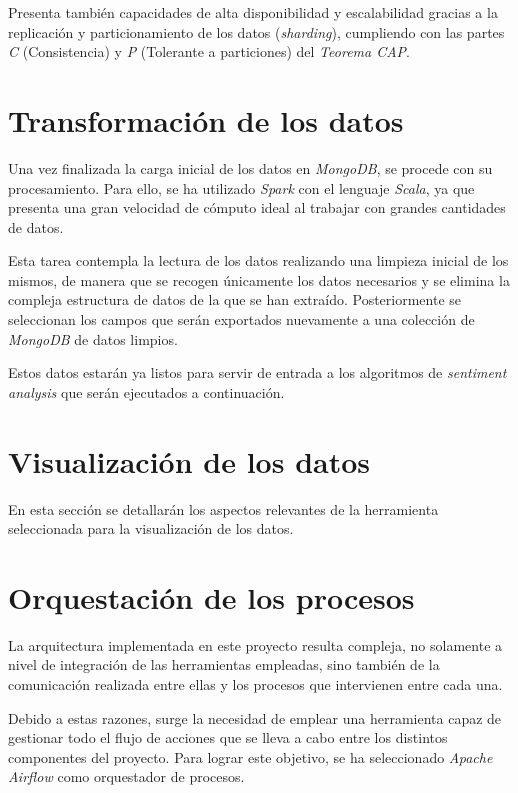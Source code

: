 Presenta también capacidades de alta disponibilidad y escalabilidad gracias a la replicación y particionamiento de los datos (\textit{sharding}), cumpliendo con las partes \textit{C} (Consistencia) y \textit{P} (Tolerante a particiones) del \textit{Teorema CAP}.

\section{Transformación de los datos}

Una vez finalizada la carga inicial de los datos en \textit{MongoDB}, se procede con su procesamiento. Para ello, se ha utilizado \textit{Spark} con el lenguaje \textit{Scala}, ya que presenta una gran velocidad de cómputo ideal al trabajar con grandes cantidades de datos.

Esta tarea contempla la lectura de los datos realizando una limpieza inicial de los mismos, de manera que se recogen únicamente los datos necesarios y se elimina la compleja estructura de datos de la que se han extraído. Posteriormente se seleccionan los campos que serán exportados nuevamente a una colección de \textit{MongoDB} de datos limpios.

Estos datos estarán ya listos para servir de entrada a los algoritmos de \textit{sentiment analysis} que serán ejecutados a continuación.

\section{Visualización de los datos}

En esta sección se detallarán los aspectos relevantes de la herramienta seleccionada para la visualización de los datos.

\section{Orquestación de los procesos}

La arquitectura implementada en este proyecto resulta compleja, no solamente a nivel de integración de las herramientas empleadas, sino también de la comunicación realizada entre ellas y los procesos que intervienen entre cada una.

Debido a estas razones, surge la necesidad de emplear una herramienta capaz de gestionar todo el flujo de acciones que se lleva a cabo entre los distintos componentes del proyecto. Para lograr este objetivo, se ha seleccionado \textit{Apache Airflow} como orquestador de procesos.

